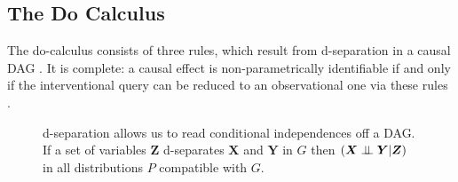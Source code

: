 \documentclass[a0,landscape,25pt,plainsections]{sciposter}
\begin{document}
\begin{multicols}{5}
\subsection*{The Do Calculus}

The do-calculus consists of three rules, which result from d-separation in a causal DAG \cite{Pearl2000}. It is complete: a causal effect is non-parametrically identifiable if and only if the interventional query can be reduced to an observational one via these rules \cite{Shpitser2008}. 

\begin{figure}
\caption{d-separation allows us to read conditional independences off a DAG. If a set of variables $\boldsymbol{Z}$ d-separates $\boldsymbol{X}$ and $\boldsymbol{Y}$ in $G$ then ${(\boldsymbol{X} \perp\!\!\!\perp \boldsymbol{Y}|\boldsymbol{Z})}$ in all distributions $P$ compatible with $G$. }
\label{fig:dsep}
\centering
{}
\end{figure}


\end{multicols}
\end{document}
